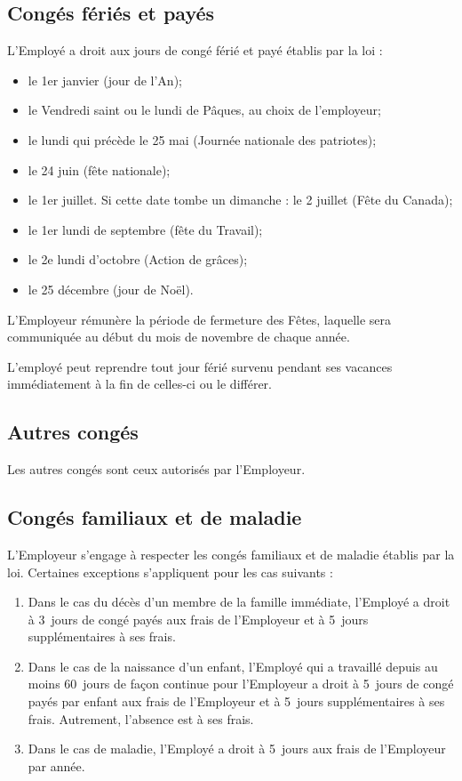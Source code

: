 \documentclass{article}
\begin{document}
    	\subsection{Congés fériés et payés}
    	L'Employé a droit aux jours de congé férié et payé établis par la loi :
    	
    	\begin{itemize}
    		\item le 1er janvier (jour de l’An);
			\item le Vendredi saint ou le lundi de Pâques, au choix de l’employeur;
			\item le lundi qui précède le 25 mai (Journée nationale des patriotes);
			\item le 24 juin (fête nationale);
			\item le 1er juillet. Si cette date tombe un dimanche : le 2 juillet (Fête du Canada);
			\item le 1er lundi de septembre (fête du Travail);
			\item le 2e lundi d’octobre (Action de grâces);
			\item le 25 décembre (jour de Noël).
    	\end{itemize}
    	
    	L'Employeur rémunère la période de fermeture des Fêtes, laquelle sera communiquée au début du mois de novembre de chaque année.
    	
    	 L'employé peut reprendre tout jour férié survenu pendant ses vacances immédiatement à la fin de celles-ci ou le différer.
    	
    	\subsection{Autres congés}
    	Les autres congés sont ceux autorisés par l'Employeur.
    	
    	\subsection{Congés familiaux et de maladie}
    	L'Employeur s'engage à respecter les congés familiaux et de maladie établis par la loi. Certaines exceptions s'appliquent pour les cas suivants :
    	
    	\begin{enumerate}
    		\item Dans le cas du décès d'un membre de la famille immédiate, l'Employé a droit à 3~jours de congé payés aux frais de l'Employeur et à 5~jours supplémentaires à ses frais.
    	
   			\item Dans le cas de la naissance d'un enfant, l'Employé qui a travaillé depuis au moins 60~jours de façon continue pour l'Employeur a droit à 5~jours de congé payés par enfant aux frais de l'Employeur et à 5~jours supplémentaires à ses frais. Autrement, l'absence est à ses frais.

   			\item Dans le cas de maladie, l'Employé a droit à 5~jours aux frais de l'Employeur par année.

    	\end{enumerate}
    	
\end{document}
